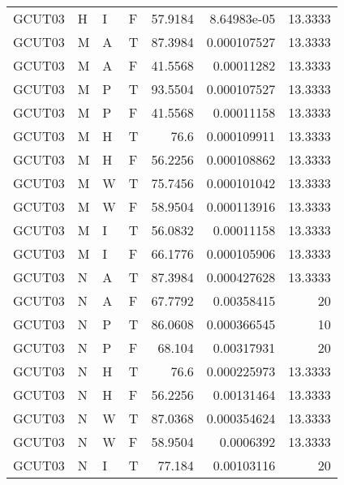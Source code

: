 \begin{longtable}{llllrrr}
    GCUT03   & H         & I         & F          & 57.9184    & 8.64983e-05 & 13.3333  \\
    GCUT03   & M         & A         & T          & 87.3984    & 0.000107527 & 13.3333  \\
    GCUT03   & M         & A         & F          & 41.5568    & 0.00011282  & 13.3333  \\
    GCUT03   & M         & P         & T          & 93.5504    & 0.000107527 & 13.3333  \\
    GCUT03   & M         & P         & F          & 41.5568    & 0.00011158  & 13.3333  \\
    GCUT03   & M         & H         & T          & 76.6       & 0.000109911 & 13.3333  \\
    GCUT03   & M         & H         & F          & 56.2256    & 0.000108862 & 13.3333  \\
    GCUT03   & M         & W         & T          & 75.7456    & 0.000101042 & 13.3333  \\
    GCUT03   & M         & W         & F          & 58.9504    & 0.000113916 & 13.3333  \\
    GCUT03   & M         & I         & T          & 56.0832    & 0.00011158  & 13.3333  \\
    GCUT03   & M         & I         & F          & 66.1776    & 0.000105906 & 13.3333  \\
    GCUT03   & N         & A         & T          & 87.3984    & 0.000427628 & 13.3333  \\
    GCUT03   & N         & A         & F          & 67.7792    & 0.00358415  & 20       \\
    GCUT03   & N         & P         & T          & 86.0608    & 0.000366545 & 10       \\
    GCUT03   & N         & P         & F          & 68.104     & 0.00317931  & 20       \\
    GCUT03   & N         & H         & T          & 76.6       & 0.000225973 & 13.3333  \\
    GCUT03   & N         & H         & F          & 56.2256    & 0.00131464  & 13.3333  \\
    GCUT03   & N         & W         & T          & 87.0368    & 0.000354624 & 13.3333  \\
    GCUT03   & N         & W         & F          & 58.9504    & 0.0006392   & 13.3333  \\
    GCUT03   & N         & I         & T          & 77.184     & 0.00103116  & 20       \\

\end{longtable}
